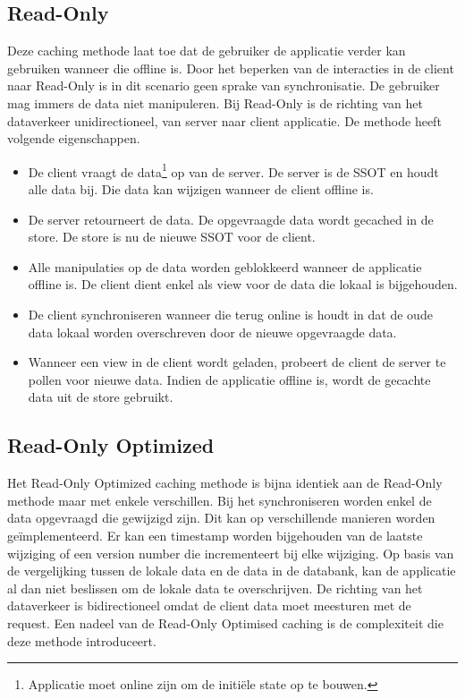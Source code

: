 \subsection{Read-Only}
Deze caching methode laat toe dat de gebruiker de applicatie verder kan gebruiken wanneer die offline is. Door het beperken van de interacties in de client naar Read-Only is in dit scenario geen sprake van synchronisatie. De gebruiker mag immers de data niet manipuleren. Bij Read-Only is de richting van het dataverkeer unidirectioneel, van server naar client applicatie. De methode heeft volgende eigenschappen.
\begin{itemize}
\item De client vraagt de data\footnote{Applicatie moet online zijn om de initi\"ele state op te bouwen.} op van de server. De server is de SSOT en houdt alle data bij. Die data kan wijzigen wanneer de client offline is.
\item De server retourneert de data. De opgevraagde data wordt gecached in de store. De store is nu de nieuwe SSOT voor de client.
\item Alle manipulaties op de data worden geblokkeerd wanneer de applicatie offline is. De client dient enkel als view voor de data die lokaal is bijgehouden.
\item De client synchroniseren wanneer die terug online is houdt in dat de oude data lokaal worden overschreven door de nieuwe opgevraagde data.
\item Wanneer een view in de client wordt geladen, probeert de client de server te pollen voor nieuwe data. Indien de applicatie offline is, wordt de gecachte data uit de store gebruikt.
\end{itemize}

\subsection{Read-Only Optimized}
Het Read-Only Optimized caching methode is  bijna identiek aan de Read-Only methode maar met enkele verschillen. Bij het synchroniseren worden enkel de data opgevraagd die gewijzigd zijn. Dit kan op verschillende manieren worden ge\"implementeerd. Er kan een timestamp worden bijgehouden van de laatste wijziging of een version number die incrementeert bij elke wijziging. Op basis van de vergelijking tussen de lokale data en de data in de databank, kan de applicatie al dan niet beslissen om de lokale data te overschrijven. De richting van het dataverkeer is bidirectioneel omdat de client data moet meesturen met de request. Een nadeel van de Read-Only Optimised caching is de complexiteit die deze methode introduceert.

